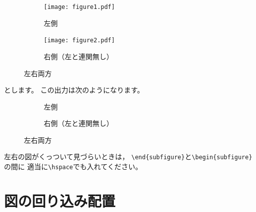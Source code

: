 \begin{ITeX}
\begin{figure}
\begin{center}
\begin{subfigure}{0.4\columnwidth}
    \begin{center}
    \texttt{[image: figure1.pdf]}
    \end{center}
    \caption{左側}
    \label{fig:left}
\end{subfigure}
\begin{subfigure}{0.4\columnwidth}
    \begin{center}
    \texttt{[image: figure2.pdf]}
    \end{center}
    \caption{右側（左と連関無し）}
    \label{fig:right}
\end{subfigure}
\end{center}
\caption{左右両方}
\label{fig:left-and-right}
\end{figure}
\end{ITeX}

とします。
この出力は次のようになります。

\begin{figure}[H]
\begin{center}
\begin{subfigure}{0.4\columnwidth}
    \begin{center}
	
    \end{center}
    \caption{左側}
    \label{fig:left_sub}
\end{subfigure}
\begin{subfigure}{0.4\columnwidth}
    \begin{center}
	
    \end{center}
    \caption{右側（左と連関無し）}
    \label{fig:right_sub}
\end{subfigure}
\end{center}
\caption{左右両方}
\end{figure}

左右の図がくっついて見づらいときは，
\verb|\end{subfigure}|と\verb|\begin{subfigure}|の間に
適当に\verb|\hspace|でも入れてください。



\section{図の回り込み配置}
\label{sec:wrapfig}

